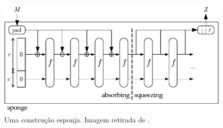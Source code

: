 \documentclass{article}
\begin{document}
\begin{itemize}
\begin{enumerate}[label=\roman*.]
\end{enumerate}

\begin{figure}[H]
    \centering
    \includegraphics[scale=0.9]{images/sponge}
    \caption{Uma construção esponja. Imagem retirada de \cite{SpongeReference}.}
    \label{fig:sponge}
\end{figure}


\end{itemize}
\end{document}
